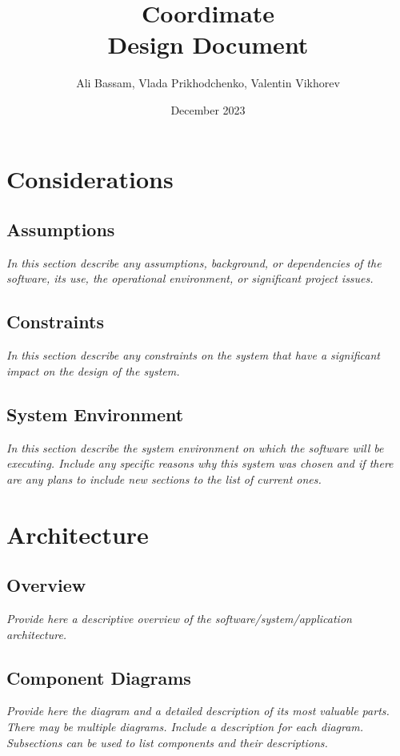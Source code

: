 \documentclass{article}
\title{Coordimate\\Design Document}
\date{December 2023}
\author{Ali Bassam, Vlada Prikhodchenko, Valentin Vikhorev}
\begin{document}
\maketitle

\section{Considerations}

\subsection{Assumptions}

\textit{In this section describe any assumptions, background, or dependencies of the
software, its use, the operational environment, or significant project issues.}

\subsection{Constraints}

\textit{In this section describe any constraints on the system that have a significant
impact on the design of the system.}

\subsection{System Environment}

\textit{In this section describe the system environment on which the software will be
executing. Include any specific reasons why this system was chosen and if there
are any plans to include new sections to the list of current ones.}


\section{Architecture}

\subsection{Overview}

\textit{Provide here a descriptive overview of the software/system/application
architecture.}

\subsection{Component Diagrams}

\textit{Provide here the diagram and a detailed description of its most valuable
parts. There may be multiple diagrams. Include a description for each diagram.
Subsections can be used to list components and their descriptions.}
\end{document}
